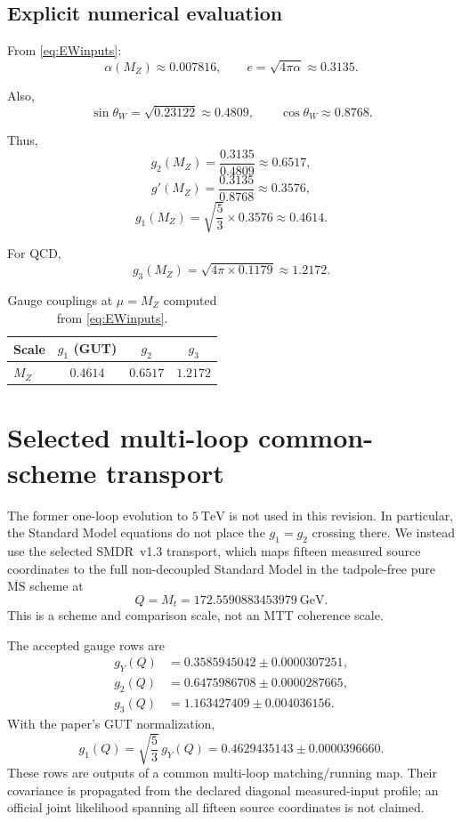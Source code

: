 \documentclass[11pt]{article}
\begin{document}
\subsection{Explicit numerical evaluation}

From \eqref{eq:EWinputs}:
\[
\alpha(M_Z) \approx 0.007816,
\qquad
e = \sqrt{4\pi\alpha} \approx 0.3135.
\]

Also,
\[
\sin\theta_W = \sqrt{0.23122} \approx 0.4809,
\qquad
\cos\theta_W \approx 0.8768.
\]

Thus,
\[
g_2(M_Z) = \frac{0.3135}{0.4809} \approx 0.6517,
\]
\[
g'(M_Z) = \frac{0.3135}{0.8768} \approx 0.3576,
\]
\[
g_1(M_Z) = \sqrt{\frac{5}{3}}\times 0.3576 \approx 0.4614.
\]

For QCD,
\[
g_3(M_Z) = \sqrt{4\pi\times 0.1179} \approx 1.2172.
\]

\begin{table}[h]
\centering
\begin{tabular}{lccc}
\toprule
Scale & $g_1$ (GUT) & $g_2$ & $g_3$ \\
\midrule
$M_Z$ & $0.4614$ & $0.6517$ & $1.2172$ \\
\bottomrule
\end{tabular}
\caption{Gauge couplings at $\mu=M_Z$ computed from \eqref{eq:EWinputs}.}
\end{table}


\section{Selected multi-loop common-scheme transport}

The former one-loop evolution to $5~\mathrm{TeV}$ is not used in this
revision.  In particular, the Standard Model equations do not place the
$g_1=g_2$ crossing there.  We instead use the selected SMDR~v1.3 transport,
which maps fifteen measured source coordinates to the full non-decoupled
Standard Model in the tadpole-free pure $\overline{\mathrm{MS}}$ scheme at
\[
 Q=M_t=172.5590883453979~\mathrm{GeV}.
\]
This is a scheme and comparison scale, not an MTT coherence scale.

The accepted gauge rows are
\begin{align}
 g_Y(Q)&=0.3585945042\pm0.0000307251,\\
 g_2(Q)&=0.6475986708\pm0.0000287665,\\
 g_3(Q)&=1.163427409\pm0.004036156.
\end{align}
With the paper's GUT normalization,
\[
 g_1(Q)=\sqrt{\frac53}\,g_Y(Q)
       =0.4629435143\pm0.0000396660.
\]
These rows are outputs of a common multi-loop matching/running map.  Their
covariance is propagated from the declared diagonal measured-input profile;
an official joint likelihood spanning all fifteen source coordinates is not
claimed.
\end{document}
